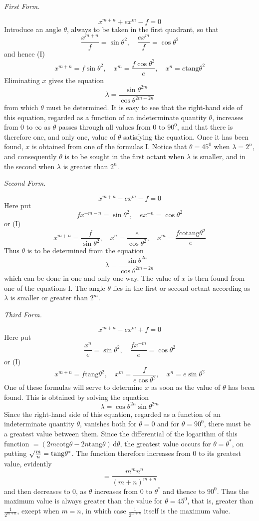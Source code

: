 \begin{center}\textit{First Form.}\end{center}
\[
x^{m+n}+e x^m-f=0
\]
Introduce an angle $\theta$, always to be taken in the first quadrant, so that
\[
\frac{x^{m+n}}{f}=\sin\theta^2,\quad
\frac{e x^m}{f}=\cos\theta^2
\]
and hence (I)
\[
x^{m+n}=f\sin\theta^2,\quad
x^m=\frac{f\cos\theta^2}{e},\quad
x^n=e\mathrm{tang}\theta^2
\]
Eliminating $x$ gives the equation
\[
\lambda=\frac{\sin\theta^{2m}}{\cos\theta^{2m+2n}}
\]
from which $\theta$ must be determined. It is easy to see that the right-hand side of this equation, regarded as a function of an indeterminate quantity $\theta$, increases from $0$ to $\infty$ as $\theta$ passes through all values from $0$ to $90^0$, and that there is therefore one, and only one, value of $\theta$ satisfying the equation. Once it has been found, $x$ is obtained from one of the formulas I. Notice that $\theta=45^0$ when $\lambda=2^n$, and consequently $\theta$ is to be sought in the first octant when $\lambda$ is smaller, and in the second when $\lambda$ is greater than $2^n$.

\begin{center}\textit{Second Form.}\end{center}
\[
x^{m+n}-ex^m-f=0
\]
Here put
\[
fx^{-m-n}=\sin\theta^2,\quad ex^{-n}=\cos\theta^2
\]
or (I)
\[
x^{m+n}=\frac{f}{\sin\theta^2},\quad
x^n=\frac{e}{\cos\theta^2},\quad
x^m=\frac{f\mathrm{cotang}\theta^2}{e}
\]
Thus $\theta$ is to be determined from the equation
\[
\lambda=\frac{\sin\theta^{2n}}{\cos\theta^{2m+2n}}
\]
which can be done in one and only one way. The value of $x$ is then found from one of the equations I. The angle $\theta$ lies in the first or second octant according as $\lambda$ is smaller or greater than $2^m$.

\begin{center}\textit{Third Form.}\end{center}
\[
x^{m+n}-ex^m+f=0
\]
Here put
\[
\frac{x^n}{e}=\sin\theta^2,\quad
\frac{fx^{-m}}{e}=\cos\theta^2
\]
or (I)
\[
x^{m+n}=f\mathrm{tang}\theta^2,\quad
x^m=\frac{f}{e\cos\theta^2},\quad
x^n=e\sin\theta^2
\]
One of these formulas will serve to determine $x$ as soon as the value of $\theta$ has been found. This is obtained by solving the equation
\[
\lambda=\cos\theta^{2n}\sin\theta^{2m}
\]
Since the right-hand side of this equation, regarded as a function of an indeterminate quantity $\theta$, vanishes both for $\theta=0$ and for $\theta=90^0$, there must be a greatest value between them. Since the differential of the logarithm of this function $=(2m\mathrm{cotg}\theta-2n\mathrm{tang}\theta)\,\mathrm{d}\theta$, the greatest value occurs for $\theta=\theta^*$, on putting $\surd\frac{m}{n}=\mathrm{tang}\theta^*$. The function therefore increases from $0$ to its greatest value, evidently
\[
=\frac{m^m n^n}{(m+n)^{m+n}}
\]
and then decreases to $0$, as $\theta$ increases from $0$ to $\theta^*$ and thence to $90^0$. Thus the maximum value is always greater than the value for $\theta=45^0$, that is, greater than $\frac{1}{2^{m+n}}$, except when $m=n$, in which case $\frac{1}{2^{m+n}}$ itself is the maximum value.

